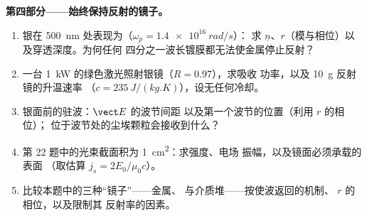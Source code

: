 \begin{problem}
\medskip
\noindent\textbf{第四部分——始终保持反射的镜子。}
\begin{enumerate}[resume]
  \item 银在 \qty{500}{nm} 处表现为（$\omega_p = \qty{1.4e16}{rad/s}$）：
        求 $\underline n$、$r$（模与相位）以及穿透深度。为何任何
        四分之一波长镀膜都无法使金属停止反射？
  \item 一台 \qty{1}{kW} 的绿色激光照射银镜（$R = 0.97$），求吸收
        功率，以及 \qty{10}{g} 反射镜的升温速率
        （$c = \qty{235}{J/(kg.K)}$），设无任何冷却。
  \item 银面前的驻波：$\vect E$ 的波节间距
        以及第一个波节的位置（利用 $r$ 的相位）；
        位于波节处的尘埃颗粒会接收到什么？
  \item 第 22 题中的光束截面积为 \qty{1}{cm^2}：求强度、电场
        振幅，以及镜面必须承载的表面
        （取估算 $j_s = 2E_0/\mu_0c$）。
  \item 比较本题中的三种“镜子”——金属、
        与介质堆——按使波返回的机制、
        $r$ 的相位，以及限制其
        反射率的因素。
\end{enumerate}
\end{problem}
